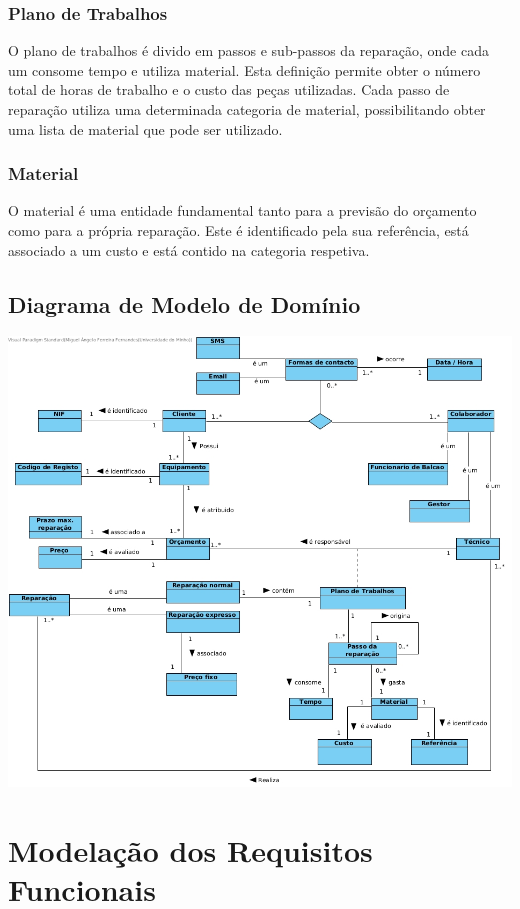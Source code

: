 \documentclass[a4paper,12pt]{scrreprt}
\begin{document}
\subsection{Plano de Trabalhos} \label{ent_plano-de-trabalhos}
O plano de trabalhos é divido em passos e sub-passos da reparação, onde cada um consome tempo e utiliza material. 
Esta definição permite obter o número total de horas de trabalho e o custo das peças utilizadas. 
Cada passo de reparação utiliza uma determinada categoria de material, possibilitando obter uma lista de material que pode ser utilizado.

\subsection{Material} \label{ent_material}
O material é uma entidade fundamental tanto para a previsão do orçamento como para a própria reparação.
Este é identificado pela sua referência, está associado a um custo e está contido na categoria respetiva.

\section{Diagrama de Modelo de Domínio} 

\includegraphics[scale=0.41]{Modelo.jpg}

\chapter{Modelação dos Requisitos Funcionais}
\end{document}
